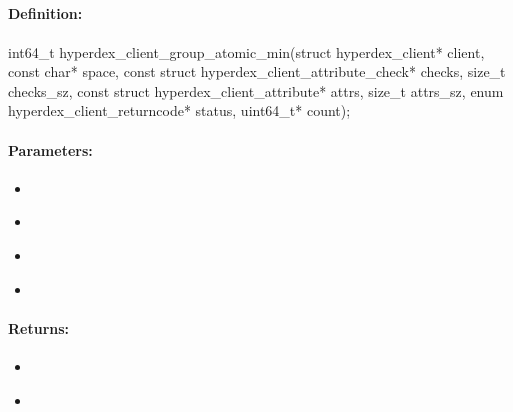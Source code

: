 \pagebreak
\subsection{}
\label{api:c:group_atomic_min}


\paragraph{Definition:}
\begin{ccode}
int64_t hyperdex_client_group_atomic_min(struct hyperdex_client* client,
        const char* space,
        const struct hyperdex_client_attribute_check* checks, size_t checks_sz,
        const struct hyperdex_client_attribute* attrs, size_t attrs_sz,
        enum hyperdex_client_returncode* status,
        uint64_t* count);
\end{ccode}

\paragraph{Parameters:}
\begin{itemize}[noitemsep]
\item {}\\

\item {}\\

\item {}\\

\item {}\\

\end{itemize}

\paragraph{Returns:}
\begin{itemize}[noitemsep]
\item {}\\

\item {}\\

\end{itemize}

